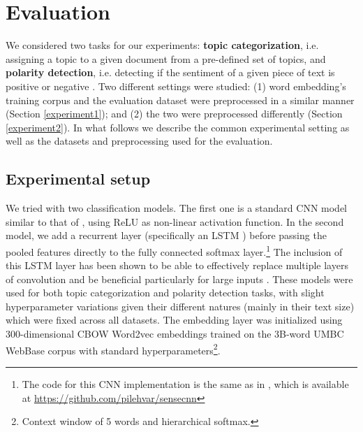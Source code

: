 \documentclass[11pt,a4paper]{article}
\begin{document}
\section{Evaluation}

We considered two tasks for our experiments: \textbf{topic categorization}, i.e. assigning a topic to a given document from a pre-defined set of topics, and \textbf{polarity detection}, i.e. detecting if the sentiment of a given piece of text is positive or negative \cite{dong2015statistical}. 
Two different settings were studied: (1) word embedding's training corpus and the evaluation dataset were preprocessed in a similar manner (Section \ref{experiment1}); and (2) the two were preprocessed differently (Section \ref{experiment2}). In what follows we describe the common experimental setting as well as the datasets and preprocessing used for the evaluation.






\subsection{Experimental setup} 


We tried with two classification models.
The first one is a standard CNN model similar to that of , using ReLU \cite{icml2010_NairH10} as non-linear activation function. In the second model, we add a recurrent layer (specifically an LSTM \cite{hochreiter1997long}) before passing the pooled features directly to the fully connected softmax layer.\footnote{The code for this CNN implementation is the same as in \cite{pilehvaracl17}, which is available at \url{https://github.com/pilehvar/sensecnn} } The inclusion of this LSTM layer has been shown to be able to effectively replace multiple layers of convolution and be beneficial particularly for large inputs \cite{XiaoCho:2016}. These models were used for both topic categorization and polarity detection tasks, with slight hyperparameter variations given their different natures (mainly in their text size) which were fixed across all datasets. 
The embedding layer was initialized using 300-dimensional CBOW Word2vec embeddings \cite{Mikolovetal:2013} trained on the 3B-word UMBC WebBase corpus \cite{han2013umbc} with standard hyperparameters\footnote{Context window of 5 words and hierarchical softmax.}. 
\end{document}
